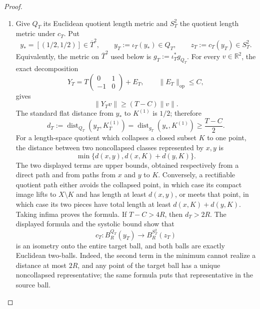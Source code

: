 \begin{proof}
\begin{enumerate}[label=\arabic*.,leftmargin=*]
\item Give \(Q_T\) its Euclidean quotient length metric and \(S_T^2\) the quotient
length metric under \(c_T\).  Put
\[
 y_*=[(1/2,1/2)]\in\overline T^2,
 \qquad y_T:=\iota_T(y_*)\in Q_T,
 \qquad z_T:=c_T(y_T)\in S_T^2.
\]
Equivalently, the metric on \(\overline T^2\) used below is
\(g_T:=\iota_T^*g_{Q_T}\).  For every \(v\in\mathbb R^2\), the exact
decomposition
\[
 Y_T=T\begin{pmatrix}0&1\\-1&0\end{pmatrix}+E_T,
 \qquad\|E_T\|_{\mathrm{op}}\leq C,
\]
gives
\[
 \|Y_Tv\|\geq(T-C)\|v\|.
\]
The standard flat distance from \(y_*\) to \(K^{(1)}\) is \(1/2\);
therefore
\begin{equation}
 d_T:=\operatorname{dist}_{Q_T}(y_T,K_T^{(1)})
 =\operatorname{dist}_{g_T}(y_*,K^{(1)})
 \geq\frac{T-C}{2}.
 \label{wb:cusp-cone-distance-to-skeleton}
\end{equation}
For a length-space quotient which collapses a closed subset \(K\) to one
point, the distance between two noncollapsed classes represented by \(x,y\)
is
\[
 \min\{d(x,y),d(x,K)+d(y,K)\}.
\]
The two displayed terms are upper bounds, obtained respectively from a
direct path and from paths from \(x\) and \(y\) to \(K\).  Conversely, a
rectifiable quotient path either avoids the collapsed point, in which case
its compact image lifts to \(X\setminus K\) and has length at least
\(d(x,y)\), or meets that point, in which case its two pieces have total
length at least \(d(x,K)+d(y,K)\).  Taking infima proves the formula.
If \(T-C>4R\), then \(d_T>2R\).  The displayed formula and the systolic
bound show that
\[
 c_T:B_R^{Q_T}(y_T)\longrightarrow B_R^{S_T^2}(z_T)
\]
is an isometry onto the entire target ball, and both balls are exactly
Euclidean two-balls.  Indeed, the second term in the minimum cannot realize
a distance at most \(2R\), and any point of the target ball has a unique
noncollapsed representative; the same formula puts that representative in
the source ball.


\end{enumerate}
\end{proof}
